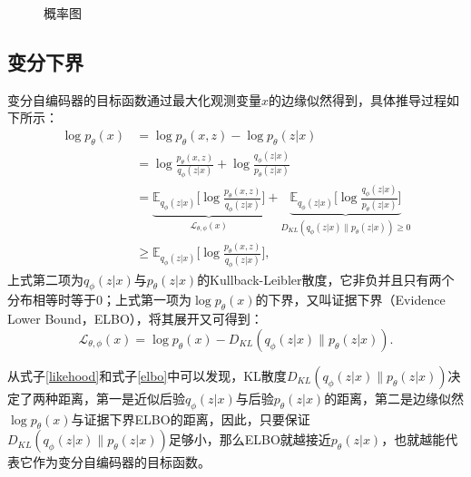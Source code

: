 \begin{figure}[htbp] 
	\centering 
	\caption{概率图}
\end{figure}

\subsection{变分下界}
变分自编码器的目标函数通过最大化观测变量$x$的边缘似然得到，具体推导过程如下所示：
\begin{equation}
\begin{split}
	\log{p_{\theta}(x)} & = \log{p_{\theta}(x, z)} - \log{p_{\theta}(z|x)} \\
	& = \log{\frac{p_{\theta}(x, z)}{q_{\phi}(z|x)}} + \log{\frac{q_{\phi}(z|x)}{p_{\theta}(z|x)}} \\
	& = \underbrace{\mathbb{E}_{q_{\phi}(z|x)}\bigg[\log{\frac{p_{\theta}(x, z)}{q_{\phi}(z|x)}}\bigg]}_{\mathcal{L}_{\theta, \phi}(x)} + \underbrace{\mathbb{E}_{q_{\phi}(z|x)}\bigg[\log{\frac{q_{\phi}(z|x)}{p_{\theta}(z|x)}}\bigg]}_{D_{KL}(q_{\phi}(z|x)\parallel p_{\theta}(z|x))\geq 0} \\
	& \geq \mathbb{E}_{q_{\phi}(z|x)}\bigg[\log{\frac{p_{\theta}(x, z)}{q_{\phi}(z|x)}}\bigg], \label{likehood}
\end{split}
\end{equation} 
上式第二项为$q_{\phi}(z|x)$与$p_{\theta}(z|x)$的Kullback-Leibler散度，它非负并且只有两个分布相等时等于0；上式第一项为$\log{p_{\theta}(x)}$的下界，又叫证据下界（Evidence Lower Bound，ELBO），将其展开又可得到：
\begin{equation}
	\mathcal{L}_{\theta, \phi}(x) = \log{p_{\theta}(x)} - D_{KL}(q_{\phi}(z|x)\parallel p_{\theta}(z|x)). \label{elbo}
\end{equation}

从式子\eqref{likehood}和式子\eqref{elbo}中可以发现，KL散度$D_{KL}(q_{\phi}(z|x)\parallel p_{\theta}(z|x))$决定了两种距离，第一是近似后验$q_{\phi}(z|x)$与后验$p_{\theta}(z|x)$的距离，第二是边缘似然$\log{p_{\theta}(x)}$与证据下界ELBO的距离，因此，只要保证$D_{KL}(q_{\phi}(z|x)\parallel p_{\theta}(z|x))$足够小，那么ELBO就越接近$p_{\theta}(z|x)$，也就越能代表它作为变分自编码器的目标函数。

